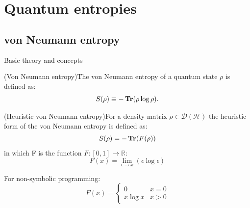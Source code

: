\documentclass{beamer}
\begin{document}
\section{Quantum entropies}
\subsection{von Neumann entropy}
\begin{frame}{Basic theory and concepts}
\begin{footnotesize}
\begin{definition}(Von Neumann entropy)The von Neumann entropy of a quantum state $\rho$ is defined as:
\begin{equation*}
S(\rho)\equiv -\operatorname{\textup{\textbf{Tr}}}(\rho \log \rho).
\end{equation*}
\end{definition}
\begin{definition}(Heuristic von Neumann entropy)For a density matrix $\rho \in \mathcal{D}(\mathcal{H})$ the heuristic form of the von Neumann entropy is defined as:
\begin{equation*}
S(\rho)=-\operatorname{\textup{\textbf{Tr}}}(F(\rho))
\end{equation*}
in which F is the function $F: [0,1] \rightarrow \mathbb{R}$: 
\begin{equation*}
F(x)=\lim_{\epsilon \to x}(\epsilon \log \epsilon)
\end{equation*}
\end{definition}
For non-symbolic programming:
\begin{equation*}
F(x)= 
 \begin{cases} 
      0 & x=0 \\
      x \log x & x > 0 
\end{cases}
\end{equation*}
\end{footnotesize}
\end{frame}
\end{document}
